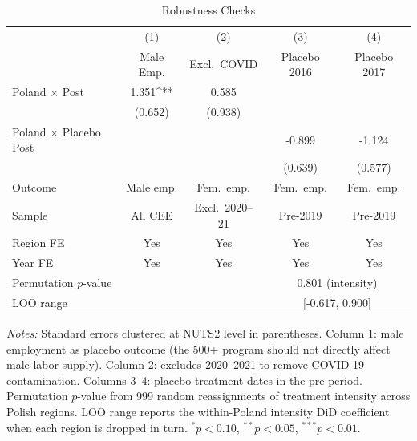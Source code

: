 \begin{table}[htbp]
\centering
\caption{Robustness Checks}
\label{tab:robustness}
\small
\begin{tabular}{lcccc}
\toprule
 & (1) & (2) & (3) & (4) \\
 & Male Emp. & Excl.\ COVID & Placebo 2016 & Placebo 2017 \\
\midrule
Poland $\times$ Post & 1.351^{**} & 0.585 & & \\
 & (0.652) & (0.938) & & \\
Poland $\times$ Placebo Post & & & -0.899 & -1.124 \\
 & & & (0.639) & (0.577) \\
\midrule
Outcome & Male emp. & Fem.\ emp. & Fem.\ emp. & Fem.\ emp. \\
Sample & All CEE & Excl.\ 2020--21 & Pre-2019 & Pre-2019 \\
Region FE & Yes & Yes & Yes & Yes \\
Year FE & Yes & Yes & Yes & Yes \\
Permutation $p$-value & & & \multicolumn{2}{c}{0.801 (intensity)} \\
LOO range & & & \multicolumn{2}{c}{[-0.617, 0.900]} \\
\bottomrule
\end{tabular}
\begin{tablenotes}[flushleft]
\small
\item \textit{Notes:} Standard errors clustered at NUTS2 level in parentheses. Column 1: male employment as placebo outcome (the 500+ program should not directly affect male labor supply). Column 2: excludes 2020--2021 to remove COVID-19 contamination. Columns 3--4: placebo treatment dates in the pre-period. Permutation $p$-value from 999 random reassignments of treatment intensity across Polish regions. LOO range reports the within-Poland intensity DiD coefficient when each region is dropped in turn. $^{*}p<0.10$, $^{**}p<0.05$, $^{***}p<0.01$.
\end{tablenotes}
\end{table}
